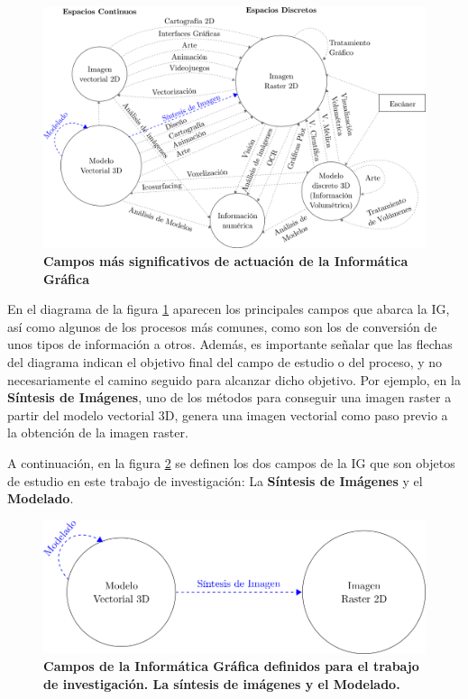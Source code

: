 \begin{figure}[h]
\includegraphics[width=16cm]{Img/CPD/grafica1.png}
\centering
\caption{\textbf{\footnotesize{Campos más significativos de actuación de la Informática Gráfica}}}
\label{fig:grafica1}
\end{figure}

En el diagrama de la figura \ref{fig:grafica1} aparecen los principales campos que abarca la IG, así como algunos de los procesos más comunes, como son los de conversión de unos tipos de información a otros. Además, es importante señalar que las flechas del diagrama indican el objetivo final del campo de estudio o del proceso, y no necesariamente el camino seguido para alcanzar dicho objetivo. Por ejemplo, en la \textbf{Síntesis de Imágenes}, uno de los métodos para conseguir una imagen raster a partir del modelo vectorial 3D, genera una imagen vectorial como paso previo a la obtención de la imagen raster.

A continuación, en la figura \ref{fig:grafica2} se definen los dos campos de la IG que son objetos de estudio en este trabajo de investigación: La \textbf{Síntesis de Imágenes} y el \textbf{Modelado}. 



\begin{figure}[h]
\includegraphics[width=12cm]{Img/CPD/grafica2.png}
\centering
\caption{\textbf{\footnotesize{Campos de la Informática Gráfica definidos para el trabajo de investigación. La síntesis de imágenes y el Modelado.}}}
\label{fig:grafica2}
\end{figure}


